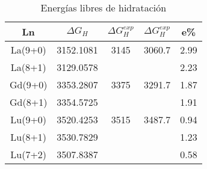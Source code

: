 \begin{table}[h!]
\centering
\caption{\footnotesize Energ\'ias libres de hidrataci\'on}%
\begin{tabular}{c|c|cc|c}\hline\hline
Ln      & $\Delta G_H$ & $\Delta G_H^{exp}$& $\Delta G_H^{exp}$ & e\% \\ \hline
La(9+0) &  3152.1081   & 3145   & 3060.7 & 2.99  \\
La(8+1) &  3129.0578   &        &        & 2.23  \\ \hline
Gd(9+0) &  3353.2807   & 3375   & 3291.7 & 1.87 \\
Gd(8+1) &  3354.5725   &        &        & 1.91 \\ \hline
Lu(9+0) &  3520.4253   & 3515   & 3487.7 & 0.94 \\
Lu(8+1) &  3530.7829   &        &        & 1.23 \\
Lu(7+2) &  3507.8387   &        &        & 0.58 \\
\hline \end{tabular}\label{t4}\end{table}
